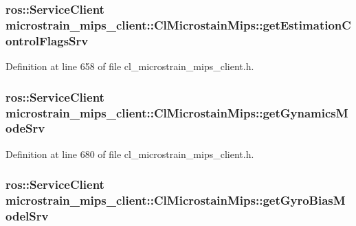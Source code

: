 \subsubsection[{\texorpdfstring{get\+Estimation\+Control\+Flags\+Srv}{getEstimationControlFlagsSrv}}]{\setlength{\rightskip}{0pt plus 5cm}ros\+::\+Service\+Client microstrain\+\_\+mips\+\_\+client\+::\+Cl\+Microstain\+Mips\+::get\+Estimation\+Control\+Flags\+Srv\hspace{0.3cm}{\ttfamily [protected]}}\hypertarget{classmicrostrain__mips__client_1_1ClMicrostainMips_a8f9c894cf9a370cabb071df0c5aaad00}{}\label{classmicrostrain__mips__client_1_1ClMicrostainMips_a8f9c894cf9a370cabb071df0c5aaad00}


Definition at line 658 of file cl\+\_\+microstrain\+\_\+mips\+\_\+client.\+h.

\subsubsection[{\texorpdfstring{get\+Gynamics\+Mode\+Srv}{getGynamicsModeSrv}}]{\setlength{\rightskip}{0pt plus 5cm}ros\+::\+Service\+Client microstrain\+\_\+mips\+\_\+client\+::\+Cl\+Microstain\+Mips\+::get\+Gynamics\+Mode\+Srv\hspace{0.3cm}{\ttfamily [protected]}}\hypertarget{classmicrostrain__mips__client_1_1ClMicrostainMips_a8be11f7821b9951e39bf2df21b9b68be}{}\label{classmicrostrain__mips__client_1_1ClMicrostainMips_a8be11f7821b9951e39bf2df21b9b68be}


Definition at line 680 of file cl\+\_\+microstrain\+\_\+mips\+\_\+client.\+h.

\subsubsection[{\texorpdfstring{get\+Gyro\+Bias\+Model\+Srv}{getGyroBiasModelSrv}}]{\setlength{\rightskip}{0pt plus 5cm}ros\+::\+Service\+Client microstrain\+\_\+mips\+\_\+client\+::\+Cl\+Microstain\+Mips\+::get\+Gyro\+Bias\+Model\+Srv\hspace{0.3cm}{\ttfamily [protected]}}\hypertarget{classmicrostrain__mips__client_1_1ClMicrostainMips_a63c964670a09edd036930cde7709e65e}{}\label{classmicrostrain__mips__client_1_1ClMicrostainMips_a63c964670a09edd036930cde7709e65e}


